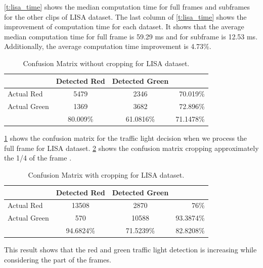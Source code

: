 \ref{t:lisa_time} shows the median computation time for full frames and subframes for the other clips of LISA dataset.
The last column of \ref{t:lisa_time} shows the improvement of computation time for each dataset.
It shows that the average median computation time for full frame is 59.29 ms and for subframe is 12.53 ms.
Additionally, the average computation time improvement is 4.73\%.


\begin{table}[h!]
  \centering
  
  \begin{tabular}{  l  c  c  r }
    \rowcolor{gray!50}   
     & Detected Red & Detected Green &  \\
    \hline
    Actual Red & 5479 & 2346 & 70.019\% \\
    Actual Green & 1369 & 3682 & 72.896\% \\
    \hline
    & 80.009\% & 61.0816\% & 71.1478\% \\
    
  \end{tabular}
  \caption{Confusion Matrix without cropping for LISA dataset.}
  \label{t:lisa_con_nocrp}
\end{table}

\ref{t:lisa_con_nocrp} shows the confusion matrix for the traffic light decision when we process the full frame for LISA dataset.
\ref{t:lisa_con_crp} shows the confusion matrix cropping approximately the 1/4 of the frame .

\begin{table}[h!]
  \centering
  
  \begin{tabular}{  l  c  c  r }
    \rowcolor{gray!50}   
     & Detected Red & Detected Green &  \\
    \hline
    Actual Red & 13508 & 2870 & 76\% \\
    Actual Green & 570 & 10588 & 93.3874\% \\
    \hline
    & 94.6824\% & 71.5239\% & 82.8208\% \\
    
  \end{tabular}
  \caption{Confusion Matrix with cropping for LISA dataset.}
  \label{t:lisa_con_crp}
\end{table}

This result shows that the red and green traffic light detection is increasing while considering the part of the frames.

